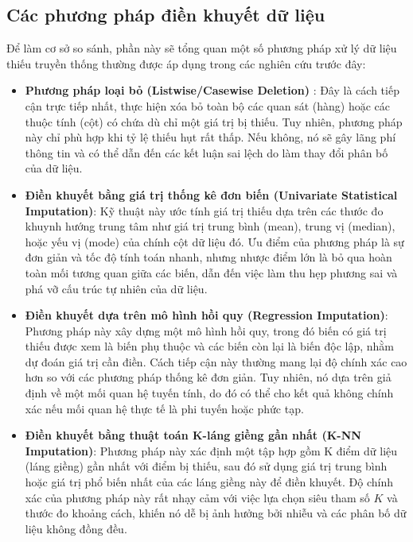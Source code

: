 \subsection{Các phương pháp điền khuyết dữ liệu}
Để làm cơ sở so sánh, phần này sẽ tổng quan một số phương pháp xử lý dữ liệu thiếu truyền thống thường được áp dụng trong các nghiên cứu trước đây:
\begin{itemize}
    \item \textbf{Phương pháp loại bỏ (Listwise/Casewise Deletion)} \cite{Pepinsky_2018}: Đây là cách tiếp cận trực tiếp nhất, thực hiện xóa bỏ toàn bộ các quan sát (hàng) hoặc các thuộc tính (cột) có chứa dù chỉ một giá trị bị thiếu. Tuy nhiên, phương pháp này chỉ phù hợp khi tỷ lệ thiếu hụt rất thấp. Nếu không, nó sẽ gây lãng phí thông tin và có thể dẫn đến các kết luận sai lệch do làm thay đổi phân bố của dữ liệu.
    
    \item \textbf{Điền khuyết bằng giá trị thống kê đơn biến (Univariate Statistical Imputation)}\cite{JEREZ2010105}: Kỹ thuật này ước tính giá trị thiếu dựa trên các thước đo khuynh hướng trung tâm như giá trị trung bình (mean), trung vị (median), hoặc yếu vị (mode) của chính cột dữ liệu đó. Ưu điểm của phương pháp là sự đơn giản và tốc độ tính toán nhanh, nhưng nhược điểm lớn là bỏ qua hoàn toàn mối tương quan giữa các biến, dẫn đến việc làm thu hẹp phương sai và phá vỡ cấu trúc tự nhiên của dữ liệu.
    
    \item \textbf{Điền khuyết dựa trên mô hình hồi quy (Regression Imputation)}\cite{zhang2016missing}: Phương pháp này xây dựng một mô hình hồi quy, trong đó biến có giá trị thiếu được xem là biến phụ thuộc và các biến còn lại là biến độc lập, nhằm dự đoán giá trị cần điền. Cách tiếp cận này thường mang lại độ chính xác cao hơn so với các phương pháp thống kê đơn giản. Tuy nhiên, nó dựa trên giả định về một mối quan hệ tuyến tính, do đó có thể cho kết quả không chính xác nếu mối quan hệ thực tế là phi tuyến hoặc phức tạp.
    
    \item \textbf{Điền khuyết bằng thuật toán K-láng giềng gần nhất (K-NN Imputation)}\cite{ZHANG20122541}: Phương pháp này xác định một tập hợp gồm K điểm dữ liệu (láng giềng) gần nhất với điểm bị thiếu, sau đó sử dụng giá trị trung bình hoặc giá trị phổ biến nhất của các láng giềng này để điền khuyết. Độ chính xác của phương pháp này rất nhạy cảm với việc lựa chọn siêu tham số \( K \) và thước đo khoảng cách, khiến nó dễ bị ảnh hưởng bởi nhiễu và các phân bố dữ liệu không đồng đều.
\end{itemize}

